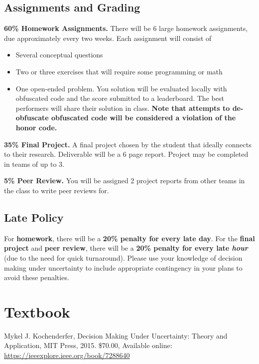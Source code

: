 \documentclass[9pt]{article}
\begin{document}
\begin{samepage}
\section*{Assignments and Grading}

\textbf{60\% Homework Assignments.}
There will be 6 large homework assignments, due approximately every two weeks. Each assignment will consist of
\begin{itemize}[nosep]
    \item Several conceptual questions
    \item Two or three exercises that will require some programming or math
    \item One open-ended problem. You solution will be evaluated locally with obfuscated code and the score submitted to a leaderboard. The best performers will share their solution in class. \textbf{Note that attempts to de-obfuscate obfuscated code will be considered a violation of the honor code.}
\end{itemize}

\textbf{35\% Final Project.}
A final project chosen by the student that ideally connects to their research. Deliverable will be a 6 page report. Project may be completed in teams of up to 3.

\textbf{5\% Peer Review.}
You will be assigned 2 project reports from other teams in the class to write peer reviews for.
\end{samepage}

\subsection*{Late Policy}

For \textbf{homework}, there will be a \textbf{20\% penalty for every late day}. For the \textbf{final project} and \textbf{peer review}, there will be a \textbf{20\% penalty for every late \emph{hour}} (due to the need for quick turnaround). Please use your knowledge of decision making under uncertainty to include appropriate contingency in your plans to avoid these penalties.

\section*{Textbook}

Mykel J. Kochenderfer, Decision Making Under Uncertainty: Theory and Application, MIT Press, 2015. \$70.00, Available online: \url{https://ieeexplore.ieee.org/book/7288640}
\end{document}
